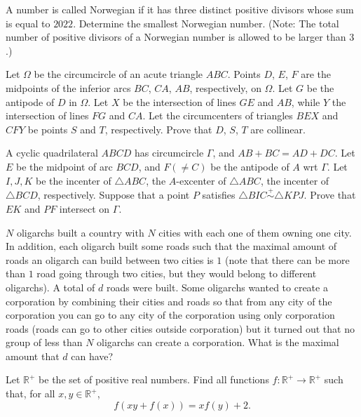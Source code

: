 \documentclass[11pt]{scrartcl}
\begin{document}
\begin{problem}[660403976209529]
A number is called Norwegian if it has three distinct positive divisors whose sum is equal to $2022$. Determine the smallest Norwegian number.
(Note: The total number of positive divisors of a Norwegian number is allowed to be larger than $3$.)
\end{problem}
\begin{problem}[607556370102952]
Let $\Omega$ be the circumcircle of an acute triangle $ABC$. Points $D$, $E$, $F$ are the midpoints of the inferior arcs $BC$, $CA$, $AB$, respectively, on $\Omega$. Let $G$ be the antipode of $D$ in $\Omega$. Let $X$ be the intersection of lines $GE$ and $AB$, while $Y$ the intersection of lines $FG$ and $CA$. Let the circumcenters of triangles $BEX$ and $CFY$ be points $S$ and $T$, respectively. Prove that $D$, $S$, $T$ are collinear.
\end{problem}
\begin{problem}[571352513856417722]
	A cyclic quadrilateral $ABCD$ has circumcircle $\Gamma$, and $AB+BC=AD+DC$. Let $E$ be the midpoint of arc $BCD$, and $F (\neq C)$ be the antipode of $A$ wrt $\Gamma$. Let $I,J,K$ be the incenter of $\triangle ABC$, the $A$-excenter of $\triangle ABC$, the incenter of $\triangle BCD$, respectively.
Suppose that a point $P$ satisfies $\triangle BIC \stackrel{+}{\sim} \triangle KPJ$. Prove that $EK$ and $PF$ intersect on $\Gamma.$
\end{problem}
\begin{problem}[4439711278400170990]
	$N$ oligarchs built a country with $N$ cities with each one of them owning one city. In addition, each oligarch built some roads such that the maximal amount of roads an oligarch can build between two cities is $1$ (note that there can be more than $1$ road going through two cities, but they would belong to different oligarchs).
A total of $d$ roads were built. Some oligarchs wanted to create a corporation by combining their cities and roads so that from any city of the corporation you can go to any city of the corporation using only corporation roads (roads can go to other cities outside corporation) but it turned out that no group of less than $N$ oligarchs can create a corporation. What is the maximal amount that $d$ can have?
\end{problem}
\begin{problem}[437645166165639]
Let $\mathbb{R}^+$ be the set of positive real numbers. Find all functions $f \colon \mathbb{R}^+ \to \mathbb{R}^+$ such that, for all $x,y \in \mathbb{R}^+$,
$$f(xy+f(x))=xf(y)+2.$$
\end{problem}
\end{document}
